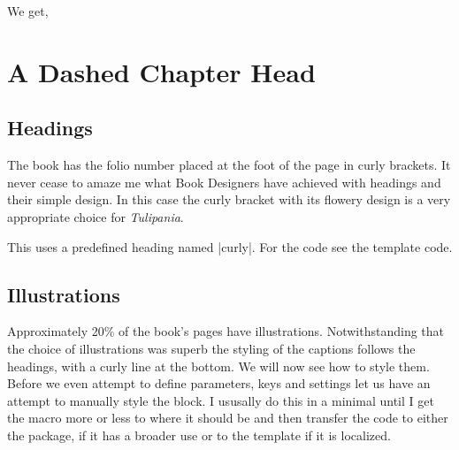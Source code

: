 \begin{texexample}{}{}
\end{texexample}

We get,

\bgroup
{}
                        
 {\centering
\begin{minipage}{0.7\textwidth}
\chapter{A Dashed Chapter Head}
\lorem
\end{minipage}
\par
}
\egroup

\bigskip

\section{Headings}

The book has the folio number placed at the foot of the page in curly brackets. It never cease to amaze me what Book Designers have achieved with headings and their simple design. In this case the  curly bracket with its flowery design is a very appropriate choice for \emph{Tulipania}. 

This uses a predefined heading named |curly|. For the code see the template code.


\section{Illustrations}

Approximately 20\% of the book’s pages have illustrations. Notwithstanding that the choice of illustrations was superb the styling of the captions follows the headings, with a curly line at the bottom.  We will now see how to style them. Before we even attempt to define parameters, keys and settings let us have an attempt to manually style the block. I ususally do this in a minimal until I get the macro more or less to where it should be and then transfer the code to either the package, if it has a broader use or to the template if it is localized.

